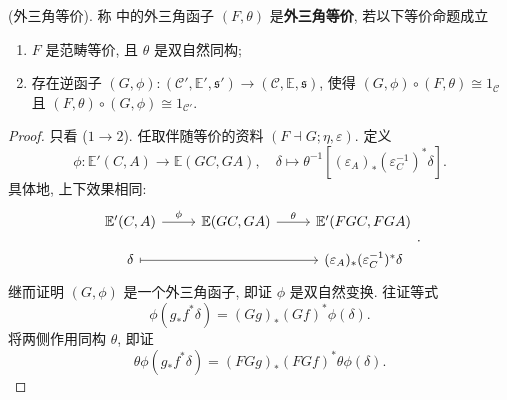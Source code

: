 \begin{theorem}
    (外三角等价). 称 中的外三角函子 $(F, \theta)$ 是\textbf{外三角等价}, 若以下等价命题成立
    \begin{enumerate}
        \item $F$ 是范畴等价, 且 $\theta$ 是双自然同构;
        \item 存在逆函子 $(G, \phi): (\mathcal{C}', \mathbb E', \mathfrak s') \to (\mathcal{C}, \mathbb E, \mathfrak s)$, 使得 $(G, \phi) \circ (F, \theta) \cong 1_{\mathcal{C}}$ 且 $(F, \theta) \circ (G, \phi) \cong 1_{\mathcal{C}'}$.
    \end{enumerate}
    \begin{proof}
        只看 ($1 \to 2$). 任取伴随等价的资料 $(F \dashv G; \eta, \varepsilon)$. 定义
        \begin{equation}
            \phi : \mathbb E'(C, A) \to \mathbb E(GC, GA),\quad \delta \mapsto \theta^{-1}\left[(\varepsilon _A)_\ast (\varepsilon _C^{-1})^\ast\delta \right].
        \end{equation}
        具体地, 上下效果相同:
        \begin{equation}
\begin{tikzcd}[ampersand replacement=\&, row sep = small]
	{\mathbb E' (C,A)} \& {\mathbb E(GC, GA)} \& {\mathbb E' (FGC, FGA)} \\
	\delta \&\& {(\varepsilon _A)_\ast (\varepsilon _C^{-1})^\ast\delta }
	\arrow["{\phi }", from=1-1, to=1-2]
	\arrow["\theta", from=1-2, to=1-3]
	\arrow[maps to, from=2-1, to=2-3]
\end{tikzcd}.
        \end{equation}
        继而证明 $(G, \phi)$ 是一个外三角函子, 即证 $\phi$ 是双自然变换. 往证等式
        \begin{equation}
            \phi(g_\ast f^\ast \delta) = (Gg)_\ast (Gf)^\ast \phi(\delta).
        \end{equation}
        将两侧作用同构 $\theta$, 即证
        \begin{equation}
            \theta \phi(g_\ast f^\ast \delta) = (FGg)_\ast (FGf)^\ast \theta \phi(\delta).
        \end{equation}

\end{proof}
\end{theorem}
